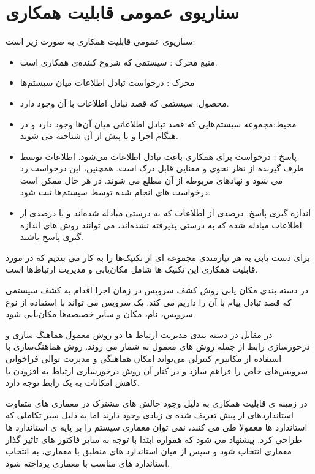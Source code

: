 \section{سناریوی عمومی قابلیت همکاری}
سناریو‌ی عمومی قابلیت همکاری به صورت زیر است:
\begin{itemize}
\item
منبع محرک : سیستمی که شروع کننده‌ی همکاری است.
\item
محرک : در‌خواست تبادل اطلاعات میان سیستم‌ها
\item
محصول: سیستمی که قصد تبادل اطلاعات با آن وجود دارد.
\item
محیط:مجموعه سیستم‌هایی که قصد تبادل اطلاعاتی میان آن‌ها وجود دارد و در هنگام اجرا و یا پیش از آن شناخته می شوند.
\item
پاسخ : درخواست برای همکاری باعث تبادل اطلاعات می‌شود. اطلاعات توسط طرف گیرنده از نظر نحوی و معنایی قابل درک است. همچنین، این درخواست رد می شود و نهادهای مربوطه از آن مطلع می شوند. در هر حال ممکن است درخواست های انجام شده توسط سیستم‌ها ثبت شود. 
\item
اندازه گیری پاسخ: درصدی از اطلاعات که به درستی مبادله شده‌اند و یا درصدی از اطلاعات مبادله شده که به درستی پذیرفته نشده‌اند، می توانند روش های اندازه گیری پاسخ باشند.
\end{itemize}

برای دست یابی به هر نیازمندی مجموعه ای از تکنیک‌ها را به کار می بندیم که در مورد قابلیت همکاری این تکنیک ها شامل مکان‌یابی  و مدیریت ارتباط‌ها  است.

در دسته بندی مکان یابی روش 	کشف سرویس  در زمان اجرا اقدام به کشف سیستمی که قصد تبادل پیام با آن را داریم می کند. یک سرویس می تواند با استفاده از نوع سرویس،‌ نام،‌ مکان و سایر خصیصه‌ها مکان‌یابی شود.

در مقابل در دسته بندی مدیریت ارتباط ها دو روش معمول هماهنگ سازی و درخور‌سازی رابط از جمله روش های معمول به شمار می روند. روش هماهنگ‌سازی  با استفاده از مکانیزم کنترلی می‌تواند امکان هماهنگی و مدیریت توالی فراخوانی سرویس‌های خاص را فراهم سازد و در کنار آن روش درخورسازی ارتباط به افزودن یا کاهش امکانات به یک رابط توجه دارد.

در زمینه ی قابلیت همکاری به دلیل وجود چالش های مشترک در معماری های متفاوت استاندارد‌های از پیش تعریف شده ی زیادی وجود دارند اما به دلیل سیر تکاملی که استاندارد ها معمولا طی می کنند، نمی توان معماری سیستم را بر پایه ی استاندارد ها طراحی کرد. پیشنهاد می شود که همواره ابتدا با توجه به سایر فاکتور های تاثیر گذار معماری انتخاب شود و سپس از میان استاندارد های منطبق با معماری،‌ به انتخاب استاندارد های مناسب با معماری پرداخته شود.

